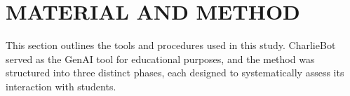\documentclass[a4paper,twoside]{article}
\begin{document}



\section{\uppercase{Material and Method}}

This section outlines the tools and procedures used in this study. CharlieBot
served as the GenAI tool for educational purposes, and the method was structured
into three distinct phases, each designed to systematically assess its
interaction with students.
\end{document}
